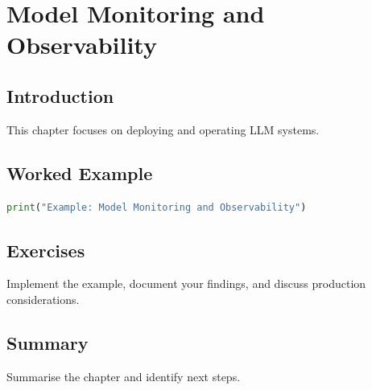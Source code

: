 \chapter{Model Monitoring and Observability}
\label{chap:vol9-18}



\section{Introduction}
This chapter focuses on deploying and operating LLM systems.

\section{Worked Example}
\begin{lstlisting}[language=Python]
print("Example: Model Monitoring and Observability")
\end{lstlisting}

\section{Exercises}
\begin{exercise}
Implement the example, document your findings, and discuss production considerations.
\end{exercise}

\section{Summary}
Summarise the chapter and identify next steps.
